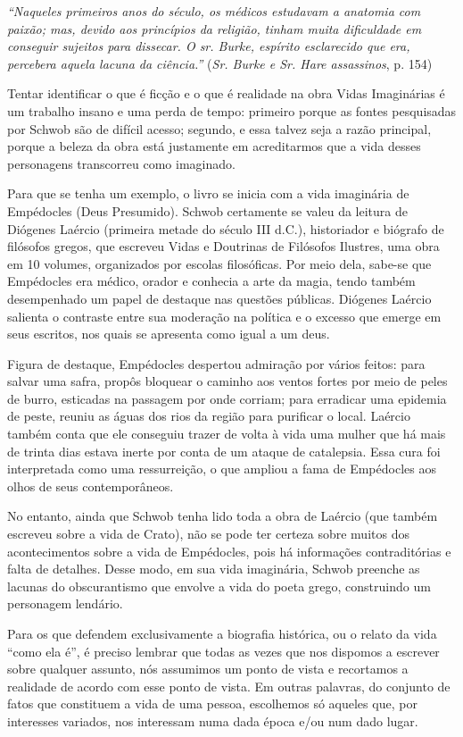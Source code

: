 \documentclass[12pt]{extarticle}
\begin{document}
\emph{``Naqueles primeiros anos do século, os médicos estudavam a
anatomia com paixão; mas, devido aos princípios da religião, tinham
muita dificuldade em conseguir sujeitos para dissecar. O sr. Burke,
espírito esclarecido que era, percebera aquela lacuna da ciência.''}
(\emph{Sr. Burke e Sr. Hare assassinos}, p. 154)

Tentar identificar o que é ficção e o que é realidade na obra Vidas
Imaginárias é um trabalho insano e uma perda de tempo: primeiro porque
as fontes pesquisadas por Schwob são de difícil acesso; segundo, e essa
talvez seja a razão principal, porque a beleza da obra está justamente
em acreditarmos que a vida desses personagens transcorreu como
imaginado.

Para que se tenha um exemplo, o livro se inicia com a vida imaginária
de Empédocles (Deus Presumido). Schwob certamente se valeu da leitura
de Diógenes Laércio (primeira metade do século III d.C.), historiador e
biógrafo de filósofos gregos, que escreveu Vidas e Doutrinas de
Filósofos Ilustres, uma obra em 10 volumes, organizados por escolas
filosóficas. Por meio dela, sabe-se que Empédocles era médico, orador e
conhecia a arte da magia, tendo também desempenhado um papel de destaque
nas questões públicas. Diógenes Laércio salienta o contraste entre sua
moderação na política e o excesso que emerge em seus escritos, nos quais
se apresenta como igual a um deus.

Figura de destaque, Empédocles despertou admiração por vários feitos:
para salvar uma safra, propôs bloquear o caminho aos ventos fortes por
meio de peles de burro, esticadas na passagem por onde corriam; para
erradicar uma epidemia de peste, reuniu as águas dos rios da região para
purificar o local. Laércio também conta que ele conseguiu trazer de
volta à vida uma mulher que há mais de trinta dias estava inerte por
conta de um ataque de catalepsia. Essa cura foi interpretada como uma
ressurreição, o que ampliou a fama de Empédocles aos olhos de seus
contemporâneos.

No entanto, ainda que Schwob tenha lido toda a obra de Laércio (que
também escreveu sobre a vida de Crato), não se pode ter certeza sobre
muitos dos acontecimentos sobre a vida de Empédocles, pois há
informações contraditórias e falta de detalhes. Desse modo, em sua vida
imaginária, Schwob preenche as lacunas do obscurantismo que envolve a
vida do poeta grego, construindo um personagem lendário.

Para os que defendem exclusivamente a biografia histórica, ou o relato
da vida ``como ela é'', é preciso lembrar que todas as vezes que nos
dispomos a escrever sobre qualquer assunto, nós assumimos um ponto de
vista e recortamos a realidade de acordo com esse ponto de vista. Em
outras palavras, do conjunto de fatos que constituem a vida de uma
pessoa, escolhemos só aqueles que, por interesses variados, nos
interessam numa dada época e/ou num dado lugar.
\end{document}
